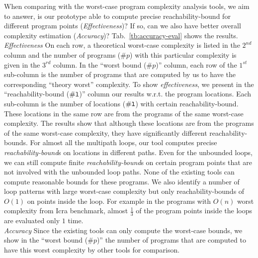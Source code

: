 When comparing with the worst-case program
complexity analysis tools, we aim to answer, is our prototype able to compute precise reachability-bound for different program points (\emph{Effectiveness})? If so, can we also have better overall complexity estimation (\emph{Accuracy})?
Tab.~\ref{tb:accuracy-eval} shows the results.
\\
\emph{Effectiveness}
\newcommand{\pointnum}{\kw{\# l}}
On each row, a theoretical worst-case complexity is listed in the $2^{nd}$ column and the number of programs ($\# p$) with this particular complexity is given in the $3^{rd}$ column.
In the ``worst bound ($\# p$)'' column, each row of the $1^{st}$ sub-column is the number of programs that are computed by us to have the corresponding ``theory worst'' complexity.
To show \textit{effectiveness}, 
we present in the ``{reachability-bound ($\pointnum$)}'' column our results w.r.t. the program locations. 
Each sub-column is the number of locations ($\pointnum$) with certain reachability-bound.
These locations in the same row are from the programs of the same worst-case complexity.
The results show that although these locations are from the programs of the same worst-case complexity, they have significantly different reachability-bounds.
For almost all the multipath loops, our tool computes precise \emph{reachability-bound}s on locations in different paths.
Even for the unbounded loops, we can still compute finite \emph{reachability-bound}s on certain program points that are not involved with the unbounded loop paths.
None of the existing tools can compute reasonable bounds for these programs.
We also identify a number of loop patterns with large worst-case complexity but only reachability-bounds of $O(1)$ on points inside the loop.
For example in the programs  with $O(n)$ worst complexity from Icra benchmark,
almost $\frac{1}{3}$ of the program points inside the loops are evaluated only $1$ time.
\\
\emph{Accuracy} Since the existing tools can only compute the worst-case bounds,
we show in the ``worst bound ($\# p$)'' the number of programs that are computed to have this worst complexity by other tools for comparison. 
